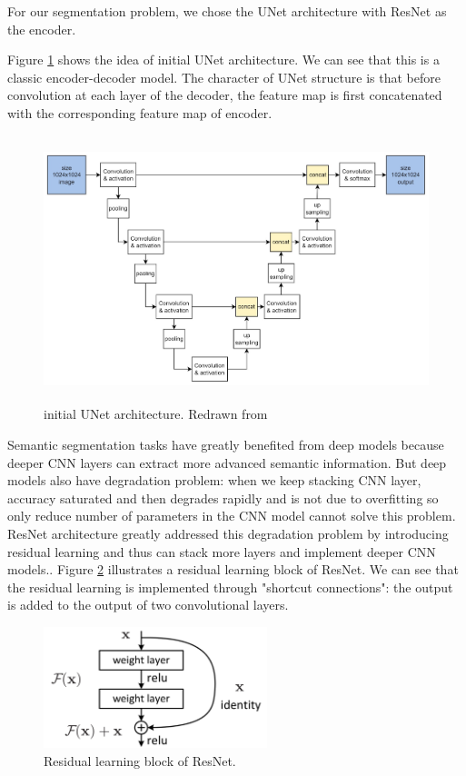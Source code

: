 \documentclass[12pt]{article}
\begin{document}
For our segmentation problem, we chose the UNet\cite{ronneberger2015u} architecture with  ResNet\cite{he2016deep} as the encoder.

Figure \ref{fig:unet} shows the idea of initial UNet architecture. We can see that this is a classic encoder-decoder model. The character of UNet structure is that before convolution at each layer of the decoder, the feature map is first concatenated with the corresponding feature map of encoder.

\begin{figure}[H]
    \centering
    \includegraphics[height=220pt]{images/unet.jpg}
    \caption{initial UNet architecture. Redrawn from \cite{ronneberger2015u}}
    \label{fig:unet}
\end{figure}

Semantic segmentation tasks have greatly benefited from deep models because deeper CNN layers can extract more advanced semantic information\cite{Girshick_2014_CVPR}. But deep models also have degradation problem: when we keep stacking CNN layer, accuracy saturated and then degrades rapidly and is not due to overfitting so only reduce number of parameters in the CNN model cannot solve this problem. ResNet architecture greatly addressed this degradation problem by introducing residual learning and thus can stack more layers and implement deeper CNN models.\cite{he2016deep}. Figure \ref{fig:resnet} illustrates a residual learning block of ResNet. We can see that the residual learning is implemented through "shortcut connections": the output is added to the output of two convolutional layers. 

\begin{figure}[H]
    \centering
    \includegraphics[height=100pt]{images/resnet.png}
    \caption{Residual learning block of ResNet.\cite{he2016deep}}
    \label{fig:resnet}
\end{figure}
\end{document}
